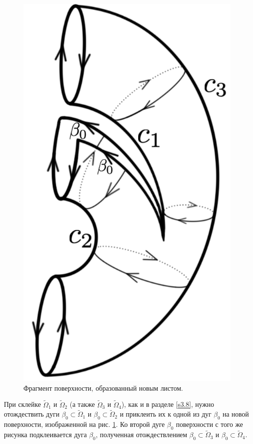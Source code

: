 \begin{figure}[!htb]
\endminipage\hfill
{}
\centering
\includegraphics[scale=0.11]{images/section3_circular/atoms/II/bifurcation/special_surface_1.pdf}
    \caption{Фрагмент поверхности, образованный новым листом.}
        \label{fig:pt10:_II_special_surface_1}
\endminipage\hfill
\end{figure}
 
 При склейке $\widetilde{\Omega}_1$ и $\widetilde{\Omega}_2$ (а также $\widetilde{\Omega}_3$ и $\widetilde{\Omega}_4$),  как и в разделе \ref{s3.8}, нужно отождествить дуги $\beta_0 \subset \widetilde{\Omega}_1$  и $\beta_0 \subset \widetilde{\Omega}_2$ и приклеить их к одной из дуг $\beta_0$ на новой поверхности, изображенной на рис.  \ref{fig:pt10:_II_special_surface_1}.
Ко второй дуге $\beta_0$ поверхности с того же рисунка подклеивается дуга $\beta_0$, полученная отождествлением $\beta_0 \subset \widetilde{\Omega}_3$  и $\beta_0 \subset \widetilde{\Omega}_4$.

